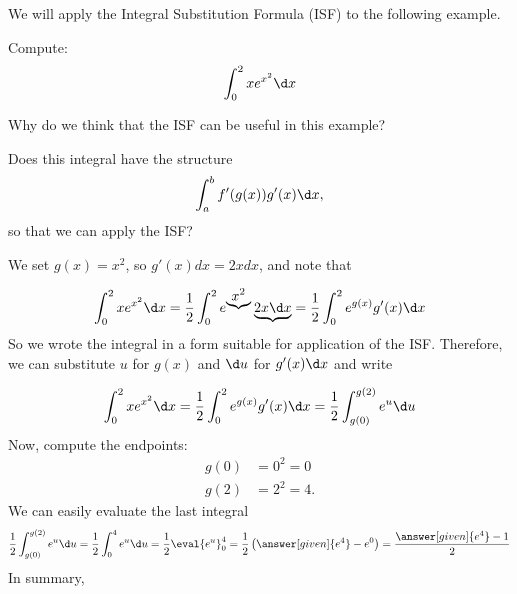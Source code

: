 \documentclass{ximera}
\begin{document}
We will apply the Integral Substitution Formula (ISF)  to the following example.

\begin{example}
Compute:
\[
\int_0^2 x e^{x^2}\d x
\]
\begin{explanation}
Why do we think that the ISF can be useful in this example?

Does this integral have the structure
\[
\int_a^b f'(g(x)) g'(x) \d x ,  
\]
so that we can apply the ISF?

We set $g(x) =x^2$, so $g'(x)dx =2xdx$, and note that

\[
\int_0^2 x e^{x^2}\d x
=\frac{1}{2}\int_0^{2} e^{\underbrace{x^2}}\underbrace{2x\d x}=\frac{1}{2}\int_0^{2} e^{g(x)}g'(x)\d x
\]
So we wrote the integral in a form suitable for application of the ISF. Therefore, we can substitute $u$ for $g(x)$ and $\d u$ for $g'(x)\d x$ and write

\[
\int_0^2 x e^{x^2}\d x=\frac{1}{2}\int_0^{2} e^{g(x)}g'(x)\d x=\frac{1}{2}\int_{g(0)}^{g(2)} e^{u}\d u
\]
Now, compute the endpoints: 
\begin{align*}
g(0) &= 0^2 = 0  \\
g(2) &=2^2 = 4.
\end{align*}
We can easily evaluate the last integral
\[
\frac{1}{2}\int_{g(0)}^{g(2)} e^{u}\d u=
\frac{1}{2}\int_{0}^{4} e^{u}\d u=\frac{1}{2}\eval{e^u}_0^4=\frac{1}{2}\left(\answer[given]{e^4}-e^0\right)=\frac{\answer[given]{e^4}-1}{2}
\]
In summary,


\end{explanation}
\end{example}
\end{document}
